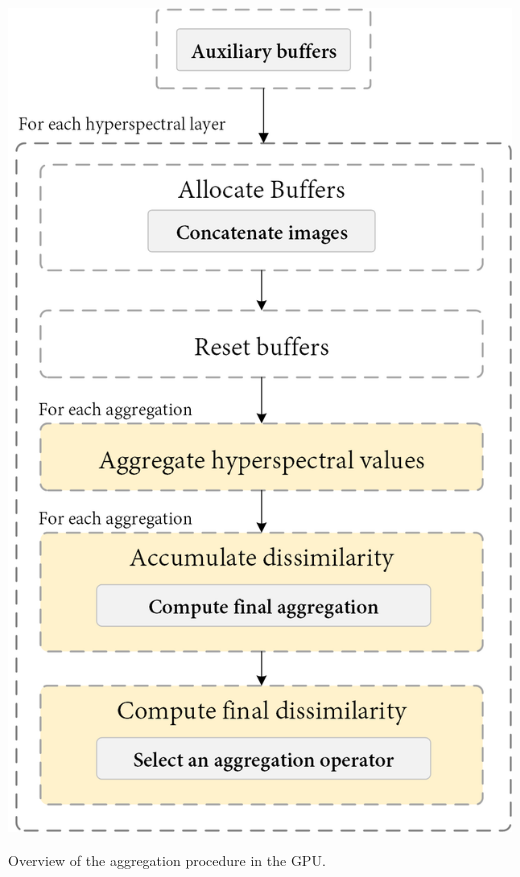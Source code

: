 \begin{marginfigure}[.2cm]
    \centering
    \includegraphics[width=\linewidth]{figs/hyper_point_cloud/aggregation_operator.png}
	\caption{Overview of the aggregation procedure in the GPU. }
	\label{fig:hyper_aggregation_insight}
\end{marginfigure}
